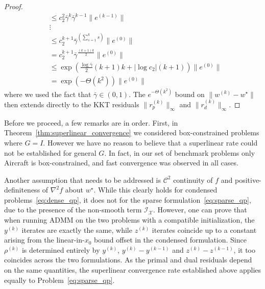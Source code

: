 \documentclass[letterpaper, 10 pt, conference]{ieeeconf}  %
\begin{document}
\begin{proof}
\begin{equation}
\begin{aligned}
        &\leq c_2^2 \bar{\gamma}^{k} \bar{\gamma}^{k-1} \|e^{(k-1)}\| \\
        &\vdots \\
        &\leq c_2^{k+1} \bar{\gamma}^{\left(\sum_{s=1}^k s\right)} \|e^{(0)}\| \\
        &= c_2^{k+1} \bar{\gamma}^{\frac{(k+1)k}{2}} \|e^{(0)}\| \\
        &\leq\exp \left(\frac{\log \bar{\gamma}}{2}(k+1) k + |\log c_2|(k+1)\right) \|e^{(0)}\| \\
        &= \exp \left( -\Theta\left(k^2\right)\right) \|e^{(0)}\|
    \end{aligned}
\end{equation}
where we used the fact that $\bar{\gamma} \in (0, 1)$. 
The $e^{-\Theta(k^2)}$ bound on $\|w^{(k)} - w^\star\|$ then extends directly to the KKT residuals $\|r_p^{(k)}\|_{\infty}$ and $\|r_d^{(k)}\|_{\infty}$.
\end{proof}

Before we proceed, a few remarks are in order. First, in Theorem~\ref{thm:superlinear_convergence} we considered box-constrained problems where $G=I$. However we have no reason to believe that a superlinear rate could not be established for general $G$. In fact, in our set of benchmark problems only Aircraft is box-constrained, and fast convergence was observed in all cases. 

Another assumption that needs to be addressed is $\mathcal{C}^2$ continuity of $f$ and positive-definiteness of $\nabla^2f$ about $w^{\star}$. While this clearly holds for condensed problems~\eqref{eq:dense_qp}, it does not for the sparse formulation~\eqref{eq:sparse_qp}, due to the presence of the non-smooth term $\mathcal{I}_{\mathcal{X}}$. However, one can prove that when running ADMM on the two problems with a compatible initialization, the $y^{(k)}$ iterates are exactly the same, while $z^{(k)}$ iterates coincide up to a constant 
arising from the linear-in-$x_0$ bound offset in the condensed formulation. Since $\rho^{(k)}$ is determined entirely 
by $y^{(k)}$, $y^{(k)} - y^{(k-1)}$ and $z^{(k)} - z^{(k-1)}$, it too coincides 
across the two formulations. As the primal and dual residuals depend on the same 
quantities, the superlinear convergence rate established above applies equally to 
Problem~\eqref{eq:sparse_qp}.
\end{document}
